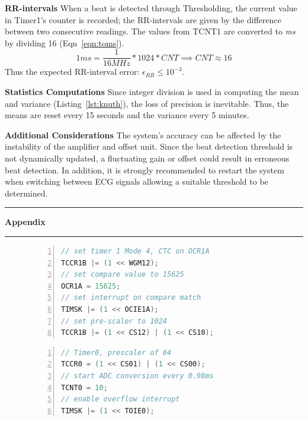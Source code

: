 \documentclass[11pt]{article}
\newcommand\question[2]{\vspace{.25in}\hrule\textbf{#1}\vspace{.5em}\hrule\vspace{.10in}}
\renewcommand\part[1]{\vspace{.10in}\textbf{#1}}
\begin{document}
\part{RR-intervals} \newline
When a beat is detected through Thresholding, the current value in Timer1's counter is recorded; the RR-intervals are given by the difference between two consecutive readings. The values from TCNT1 are converted to \textit{ms} by dividing 16 (Eqn~\ref{eqn:toms}).
\begin{equation}
\label{eqn:toms}
1ms = \frac{1}{16MHz}*1024*CNT \implies CNT \approx 16
\end{equation}
Thus the expected RR-interval error: $\epsilon_{RR} \leq 10^{-3}$.

\part{Statistics Computations} \newline
Since integer division is used in computing the mean and variance (Listing~\ref{lst:knuth}), the loss of precision is inevitable. Thus, the means are reset every 15 seconds and the variance every 5 minutes.

\part{Additional Considerations} \newline
The system's accuracy can be affected by the instability of the amplifier and offset unit. Since the beat detection threshold is not dynamically updated, a fluctuating gain or offset could result in erroneous beat detection. In addition, it is strongly recommended to restart the system when switching between ECG signals allowing a suitable threshold to be determined.

\newpage
\question{Appendix}{}
\begin{figure}[H]
\begin{minipage}{0.5\textwidth}
\centering
\begin{lstlisting}[language=C, numbers=left, stepnumber=1, caption=Timer1 settings, label=lst:timer1]
// set timer 1 Mode 4, CTC on OCR1A
TCCR1B |= (1 << WGM12);
// set compare value to 15625
OCR1A = 15625;
// set interrupt on compare match
TIMSK |= (1 << OCIE1A);
// set pre-scaler to 1024
TCCR1B |= (1 << CS12) | (1 << CS10);
\end{lstlisting}
\end{minipage}
%
\begin{minipage}{0.5\textwidth}
\centering
\begin{lstlisting}[language=C, numbers=left, stepnumber=1, caption=Timer0 settings, label=lst:timer0]
// Timer0, prescaler of 64
TCCR0 = (1 << CS01) | (1 << CS00);
// start ADC conversion every 0.98ms
TCNT0 = 10;
// enable overflow interrupt
TIMSK |= (1 << TOIE0);
\end{lstlisting}
\end{minipage}
\end{figure}
\end{document}
